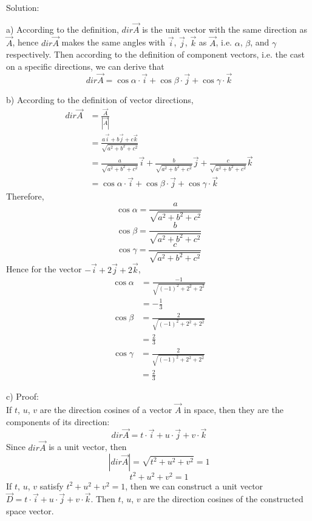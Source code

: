 \documentclass{article}
\begin{document}
Solution:

a) According to the definition, $dir \vec{A}$ is the unit vector with the same
direction as $\vec{A}$, hence $dir \vec{A}$ makes the same angles with
$\vec{i}$, $\vec{j}$, $\vec{k}$ as $\vec{A}$, i.e. $\alpha$, $\beta$, and 
$\gamma$ respectively. Then according to the definition of component vectors, 
i.e. the cast on a specific directions, we can derive that
\[
  dir \vec{A} = \cos\alpha \cdot \vec{i} + \cos\beta \cdot \vec{j} + \cos\gamma \cdot \vec{k}
\]

b) According to the definition of vector directions, 
\[
  \begin{split}
    dir \vec{A} &= \frac{\vec{A}}{|\vec{A}|} \\
                &= \frac{a \vec{i} + b \vec{j} + c \vec{k}}{\sqrt{a^2 + b^2 + c^2}} \\
                &= \frac{a}{\sqrt{a^2 + b^2 + c^2}} \vec{i} + \frac{b}{\sqrt{a^2 + b^2 + c^2}} \vec{j} + \frac{c}{\sqrt{a^2 + b^2 + c^2}} \vec{k} \\
                &= \cos\alpha \cdot \vec{i} + \cos\beta \cdot \vec{j} + \cos\gamma \cdot \vec{k}
  \end{split}
\]
Therefore,
\[
  \cos\alpha = \frac{a}{\sqrt{a^2 + b^2 + c^2}}
\]
\[
  \cos\beta = \frac{b}{\sqrt{a^2 + b^2 + c^2}}
\]
\[
  \cos\gamma = \frac{c}{\sqrt{a^2 + b^2 + c^2}}
\]
Hence for the vector $-\vec{i} + 2\vec{j} + 2\vec{k}$,
\[
  \begin{split}
    \cos\alpha &= \frac{-1}{\sqrt{(-1)^2 + 2^2 + 2^2}} \\
               &= -\frac{1}{3}
  \end{split}
\]
\[
  \begin{split}
    \cos\beta &= \frac{2}{\sqrt{(-1)^2 + 2^2 + 2^2}} \\
              &= \frac{2}{3}
  \end{split}
\]
\[
  \begin{split}
    \cos\gamma &= \frac{2}{\sqrt{(-1)^2 + 2^2 + 2^2}} \\
              &= \frac{2}{3}
  \end{split}
\]

c) Proof: \\
If $t$, $u$, $v$ are the direction cosines of a vector $\vec{A}$ in space, then 
they are the components of its direction:
\[
  dir \vec{A} = t \cdot \vec{i} + u \cdot \vec{j} + v \cdot \vec{k}
\]
Since $dir \vec{A}$ is a unit vector, then
\[
  |dir \vec{A}| = \sqrt{t^2 + u^2 + v^2} = 1
\]
\[
  t^2 + u^2 + v^2 = 1
\]
If $t$, $u$, $v$ satisfy $t^2 + u^2 + v^2 = 1$, then we can construct a unit 
vector $\vec{D} = t \cdot \vec{i} + u \cdot \vec{j} + v \cdot \vec{k}$. Then 
$t$, $u$, $v$ are the direction cosines of the constructed space vector.
\end{document}
